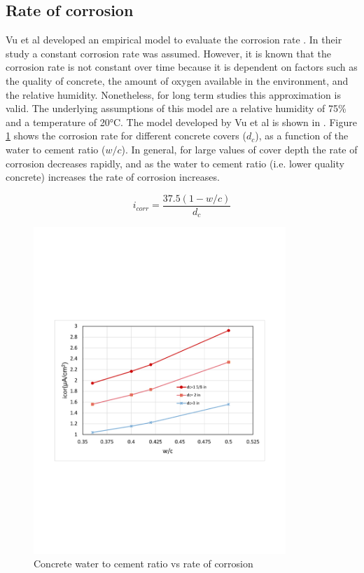 \subsection{Rate of corrosion}

Vu et al developed an empirical model to evaluate the corrosion rate \cite{Vu2000}\cite{Stewart1998}. In their study a constant corrosion rate was assumed. However, it is known that the corrosion rate is not constant over time because it is dependent on factors such as the quality of concrete, the amount of oxygen available in the environment, and the relative humidity.  Nonetheless, for long term studies this approximation is valid. The underlying assumptions of this model are a relative humidity of 75\% and a temperature of 20°C. The model developed by Vu et al is shown in . Figure \ref{fig:hist1} shows the corrosion rate for different concrete covers ($d_c$), as a function of the water to cement ratio ($w/c$). In general, for large values of cover depth the rate of corrosion decreases rapidly, and as the water to cement ratio (i.e. lower quality concrete) increases the rate of corrosion increases.

\begin{equation}
  i_{corr}=\frac{37.5(1-w/c)}{d_c}
  \label{eq.CorrosionRate}
\end{equation} 

\begin{figure}[htbp]
\centering
\includegraphics[width=0.85\textwidth]{Chapter-2/figs/wc_icor}
\caption{Concrete water to cement ratio vs rate of corrosion}
\label{fig:hist1}
\end{figure}

